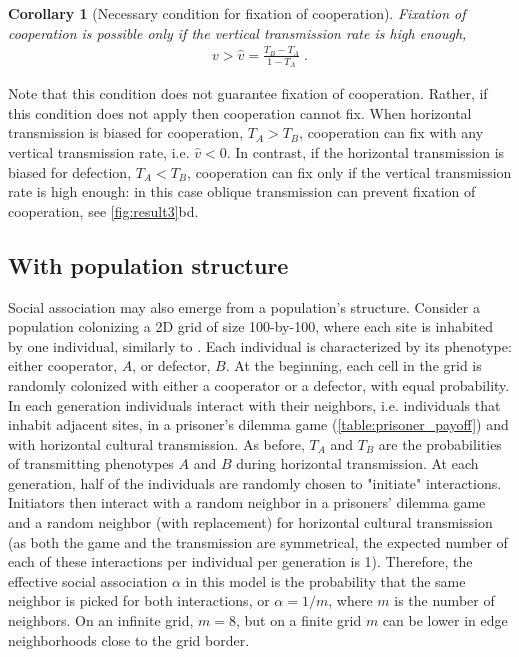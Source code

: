 \documentclass[12pt]{extarticle}
\newtheorem{corollary}{Corollary}
\begin{document}
{\begin{corollary}[Necessary condition for fixation of cooperation]
\label{corollary:vhat}
  Fixation of cooperation is possible only if the vertical transmission rate is high enough,
  \begin{equation} \label{eq:fixation_of_cooperation_vertical_transmission_condition}
    \begin{aligned}
      v>\hat{v} = \frac{T_B - T_A}{1-T_A} \;.
    \end{aligned}
    \end{equation} 
\end{corollary}
Note that this condition does not guarantee fixation of cooperation. Rather, if this condition does not apply then cooperation cannot fix.
When horizontal transmission is biased for cooperation, $T_A>T_B$, cooperation can fix with any vertical transmission rate, i.e. $\hat{v}<0$.
In contrast, if the horizontal transmission is biased for defection, $T_A<T_B$,  cooperation can fix only if the vertical transmission rate is high enough: in this case oblique transmission can prevent fixation of cooperation, see \autoref{fig:result3}bd.
\\


\subsection*{With population structure}

Social association may also emerge from a population's structure.
Consider a  population colonizing a 2D grid of size 100-by-100, where each site is inhabited by one individual, similarly to \citet{lewin2020rockpaperscissors}.
Each individual is characterized by its phenotype: either cooperator, $A$, or defector, $B$.
At the beginning, each cell in the grid is randomly colonized with either a cooperator or a defector, with equal probability.
In each generation individuals interact with their neighbors, i.e. individuals that inhabit adjacent sites, in a prisoner's dilemma game (\autoref{table:prisoner_payoff}) and with horizontal cultural transmission.
As before, $T_A$ and $T_B$ are the probabilities of transmitting phenotypes $A$ and $B$ during horizontal transmission.
At each generation, half of the individuals are randomly chosen to "initiate" interactions.
Initiators then interact with a random neighbor in a prisoners' dilemma game and a random neighbor (with replacement) for horizontal cultural transmission (as both the game and the transmission are symmetrical, the expected number of each of these interactions per individual per generation is 1).
Therefore, the effective social association $\alpha$ in this model is the probability that the same neighbor is picked for both interactions, or $\alpha=1/m$, where $m$ is the number of neighbors.
On an infinite grid, $m=8$, but on a finite grid $m$ can be lower in edge neighborhoods close to the grid border.

}
\end{document}
